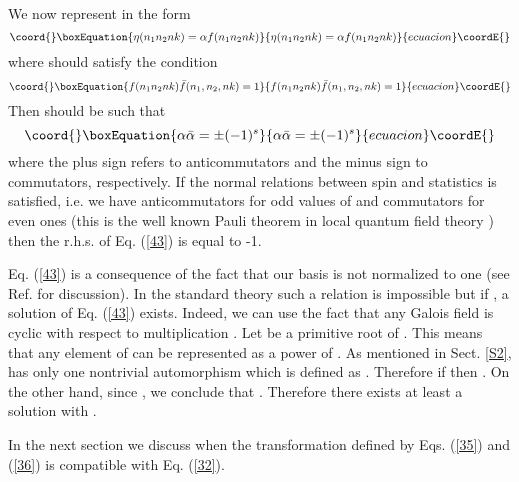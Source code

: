 \documentclass[a4paper,12pt]{article}%
\begin{document}
We now represent \coordHE{} in the form 
\begin{equation}\coord{}\boxEquation{
\eta(n_1n_2nk)=\alpha f(n_1n_2nk)
\label{41}
}{
\eta(n_1n_2nk)=\alpha f(n_1n_2nk)
}{ecuacion}\coordE{}\end{equation}
where \coordHE{} should satisfy the condition
\begin{equation}\coord{}\boxEquation{
f(n_1n_2nk) {\bar f}(n_1,n_2,nk)=1
\label{42}
}{
f(n_1n_2nk) {\bar f}(n_1,n_2,nk)=1
}{ecuacion}\coordE{}\end{equation}
Then \myHighlight{$\alpha$}\coordHE{} should be such that 
\begin{equation}\coord{}\boxEquation{
\alpha {\bar \alpha}=\pm (-1)^s
\label{43}
}{
\alpha {\bar \alpha}=\pm (-1)^s
}{ecuacion}\coordE{}\end{equation}
where the plus sign refers to anticommutators and the minus
sign to commutators, respectively.
If the normal relations between spin and
statistics is satisfied, i.e. we have anticommutators for
odd values of \coordHE{} and commutators for even ones (this is the 
well known Pauli theorem in local quantum field theory 
\cite{Pauli}) then the r.h.s. 
of Eq. (\ref{43}) is equal to -1. 

Eq. (\ref{43}) is a consequence of the fact that our basis is
not normalized to one (see Ref. \cite{lev2} for discussion).
In the standard theory such a relation is 
impossible but if \coordHE{}, a solution of Eq. (\ref{43}) 
exists. Indeed, we can use the fact that any Galois field is 
cyclic with respect to multiplication \cite{VDW,IR}. 
Let \coordHE{} be a primitive root of \coordHE{}. This means that any
element of \coordHE{} can be represented as a power of \coordHE{}. 
As mentioned in Sect. \ref{S2}, \coordHE{} has only one
nontrivial automorphism which is defined as 
\coordHE{}. 
Therefore if \coordHE{} then \coordHE{}. On the other hand, since \coordHE{}, we
conclude that \coordHE{}. Therefore there exists at
least a solution with \coordHE{}. 

In the next section we discuss when the transformation
defined by Eqs. (\ref{35}) and (\ref{36}) is compatible
with Eq. (\ref{32}). 
\end{document}
